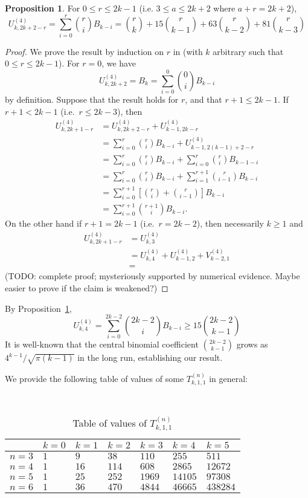 \documentclass[thesis]{thesis-umich}           %
\theoremstyle{definition}
\newtheorem{prop}[thm]{Proposition}
\begin{document}
\begin{prop}
  \label{prop:asymptotic}
  For $0\leq r\leq 2k-1$ (i.e. $3\leq a\leq 2k+2$ where $a+r=2k+2$),
  \[
  U_{k,2k+2-r}^{(4)}=\sum_{i=0}^{r}\binom{r}{i}B_{k-i}=\binom{r}{k}+15\binom{r}{k-1}+63\binom{r}{k-2}+81\binom{r}{k-3}
  \]
\end{prop}
\begin{proof}
  We prove the result by induction on $r$ in
  (with $k$ arbitrary such that $0\leq r\leq 2k-1$).
  For $r=0$, we have
  \[
  U_{k,2k+2}^{(4)}=B_k=\sum_{i=0}^0\binom{0}{i}B_{k-i}
  \]
  by definition.
  Suppose that the result holds for $r$, and that $r+1\leq 2k-1$.
  If $r+1<2k-1$ (i.e.\ $r\leq 2k-3$), then
  \begin{align*}
    U_{k,2k+1-r}^{(4)} &= U_{k,2k+2-r}^{(4)}+U_{k-1,2k-r}^{(4)} \\
    &=\sum_{i=0}^r\binom riB_{k-i}+U_{k-1,2(k-1)+2-r}^{(4)} \\
    &=\sum_{i=0}^r\binom riB_{k-i}+
    \sum_{i=0}^r\binom riB_{k-1-i} \tag*{(since $r\leq 2(k-1)-1$)}
    \\
    &=\sum_{i=0}^r\binom riB_{k-i}+\sum_{i=1}^{r+1}\binom r{i-1}B_{k-i} \tag*{(relabeling $i+1$ as $i$)} \\
    &=\sum_{i=0}^{r+1}\left[\binom ri+\binom r{i-1}\right]B_{k-i}\\
    &=\sum_{i=0}^{r+1}\binom{r+1}{i}B_{k-i}.
  \end{align*}
  On the other hand if $r+1=2k-1$ (i.e.\ $r=2k-2$), then
  necessarily $k\geq 1$ and
  \begin{align*}
    U_{k,2k+1-r}^{(4)}&=U_{k,3}^{(4)} \\
    &=U_{k,4}^{(4)}+U_{k-1,2}^{(4)}+V_{k-2,1}^{(4)} \\
    &=
  \end{align*}
  (TODO: complete proof; mysteriously supported by numerical evidence. Maybe easier to prove if the claim is weakened?)
\end{proof}
By Proposition~\ref{prop:asymptotic},
\[
U_{k,4}^{(4)}=\sum_{i=0}^{2k-2}\binom{2k-2}{i}B_{k-i}\geq 15\binom{2k-2}{k-1}
\]
It is well-known \cite{Binomial} that the central binomial coefficient $\binom{2k-2}{k-1}$ grows as $4^{k-1}/\sqrt{\pi(k-1)}$ in the long run, establishing our result.

We provide the following table of values of some $T_{k,1,1}^{(n)}$ in general:

  \begin{table}[h]
    \caption{Table of values of $T_{k,1,1}^{(n)}$}
    \centering
    ~\\
  \begin{tabular}{l|l|l|l|l|l|l|}
    & $k=0$ & $k=1$ & $k=2$ & $k=3$ & $k=4$ & $k=5$ \\ \hline
    $n=3$ & $1$ & $9$ & $38$ & $110$ & $255$ & $511$ \\ \hline
    $n=4$ & $1$ & $16$ & $114$ & $608$ & $2865$ & $12672$ \\ \hline
    $n=5$ & $1$ & $25$ & $252$ & $1969$ & $14105$ & $97308$ \\ \hline
    $n=6$ & $1$ & $36$ & $470$ & $4844$ & $46665$ & $438284$ \\ \hline
\end{tabular}
  \end{table}
\end{document}
